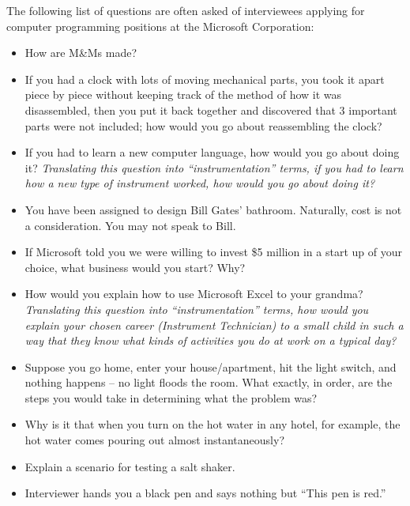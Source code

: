

The following list of questions are often asked of interviewees applying for computer programming positions at the Microsoft Corporation:

\begin{itemize}
\item{} How are M\&Ms made?
\vskip 5pt
\item{} If you had a clock with lots of moving mechanical parts, you took it apart piece by piece without keeping track of the method of how it was disassembled, then you put it back together and discovered that 3 important parts were not included; how would you go about reassembling the clock?
\vskip 5pt
\item{} If you had to learn a new computer language, how would you go about doing it? {\it Translating this question into ``instrumentation'' terms, if you had to learn how a new type of instrument worked, how would you go about doing it?}
\vskip 5pt
\item{} You have been assigned to design Bill Gates' bathroom.  Naturally, cost is not a consideration.  You may not speak to Bill.
\vskip 5pt
\item{} If Microsoft told you we were willing to invest \$5 million in a start up of your choice, what business would you start?  Why?
\vskip 5pt
\item{} How would you explain how to use Microsoft Excel to your grandma?  {\it Translating this question into ``instrumentation'' terms, how would you explain your chosen career (Instrument Technician) to a small child in such a way that they know what kinds of activities you do at work on a typical day?}
\vskip 5pt
\item{} Suppose you go home, enter your house/apartment, hit the light switch, and nothing happens -- no light floods the room.  What exactly, in order, are the steps you would take in determining what the problem was?
\vskip 5pt
\item{} Why is it that when you turn on the hot water in any hotel, for example, the hot water comes pouring out almost instantaneously?
\vskip 5pt
\item{} Explain a scenario for testing a salt shaker.
\vskip 5pt
\item{} Interviewer hands you a black pen and says nothing but ``This pen is red.''
\end{itemize}

